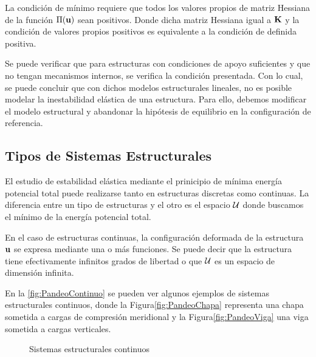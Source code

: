 La condición de mínimo requiere que todos los valores propios de matriz Hessiana de la función $\Pi({\bf u})$ sean positivos. Donde dicha matriz Hessiana igual a ${\bf K}$ y la condición de valores propios positivos es equivalente a la condición de definida positiva. 

Se puede verificar que para estructuras con condiciones de apoyo suficientes y que no tengan mecanismos internos, se verifica la condición presentada. Con lo cual, se puede concluir que con dichos modelos estructurales lineales, no es posible modelar la inestabilidad elástica de una estructura. Para ello, debemos modificar el modelo estructural y abandonar la hipótesis de equilibrio en la configuración de referencia.
 

\subsection{Tipos de Sistemas Estructurales} 

El estudio de estabilidad elástica mediante el prinicipio de mínima energía potencial total puede realizarse tanto en estructuras discretas como continuas. La diferencia entre un tipo de estructuras y el otro es el espacio ${\mathcal U}$ donde buscamos el mínimo de la energía potencial total.

En el caso de estructuras continuas, la configuración deformada de la estructura ${\bf u}$ se expresa mediante una o más funciones. Se puede decir que la estructura tiene efectivamente infinitos grados de libertad o que ${\mathcal U}$ es un espacio de dimensión infinita.

En la \autoref{fig:PandeoContinuo} se pueden ver algunos ejemplos de sistemas estructurales continuos, donde la Figura\autoref{fig:PandeoChapa} representa una chapa sometida a cargas de compresión meridional y la Figura\autoref{fig:PandeoViga} una viga sometida a cargas verticales.

\begin{figure}[htb]
	\centering
{}
\hspace{1em}
\caption{Sistemas estructurales continuos}
	\label{fig:PandeoContinuo}
\end{figure}

